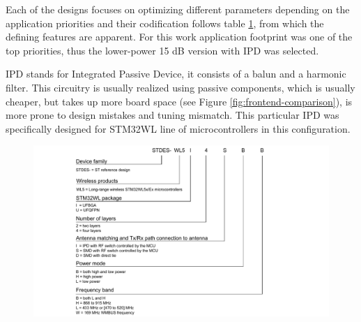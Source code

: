 Each of the designs focuses on optimizing different parameters depending on the application priorities and their codification follows table \ref{fig:reference-design-codification}, from which the defining features are apparent. For this work application footprint was one of the top priorities, thus the lower-power 15 dB version with IPD was selected.

IPD stands for Integrated Passive Device, it consists of a balun and a harmonic filter. This circuitry is usually realized using passive components, which is usually cheaper, but takes up more board space (see Figure \ref{fig:frontend-comparison}), is more prone to design mistakes and tuning mismatch. This particular IPD was specifically designed for STM32WL line of microcontrollers in this configuration.

\begin{figure}
    \includegraphics[width=\textwidth]{fig/STDES-xxxxxxx.png}
    \caption{\label{fig:reference-design-codification}}
\end{figure}

